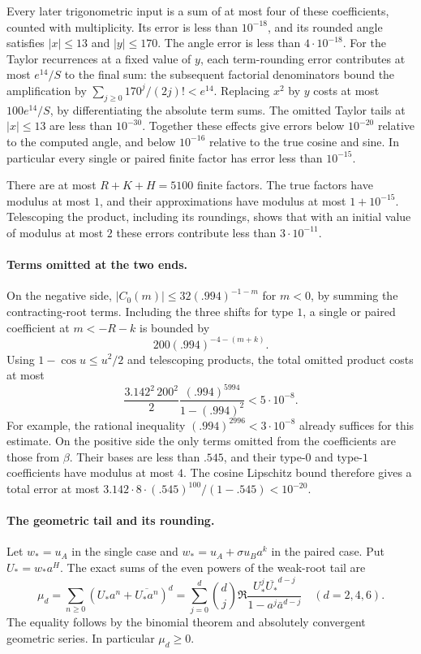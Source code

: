 Every later trigonometric input is a sum of at most four of these
coefficients, counted with multiplicity.  Its error is less than
$10^{-18}$, and its rounded angle satisfies $|x|\le13$ and $|y|\le170$.
The angle error is less than $4\cdot10^{-18}$.  For the Taylor
recurrences at a fixed value of $y$, each term-rounding error
contributes at most $e^{14}/S$ to the final sum: the subsequent
factorial denominators bound the amplification by
$\sum_{j\ge0}170^j/(2j)!<e^{14}$.  Replacing $x^2$ by $y$ costs
at most $100e^{14}/S$, by differentiating the absolute term sums.
The omitted Taylor tails at $|x|\le13$ are less than $10^{-30}$.
Together these effects give errors below $10^{-20}$ relative to
the computed angle, and below $10^{-16}$ relative to the true
cosine and sine.  In particular every single or paired finite
factor has error less than $10^{-15}$.

There are at most $R+K+H=5100$ finite factors.  The true factors have
modulus at most $1$, and their approximations have modulus at most
$1+10^{-15}$.  Telescoping the product, including its roundings,
shows that with an initial value of modulus at most $2$ these errors
contribute less than $3\cdot10^{-11}$.

\paragraph{Terms omitted at the two ends.}
On the negative side, $|C_0(m)|\le32(.994)^{-1-m}$ for $m<0$,
by summing the contracting-root terms.  Including the three shifts
for type $1$, a single or paired coefficient at $m<-R-k$ is bounded by
\[
 200(.994)^{-4-(m+k)}.
\]
Using $1-\cos u\le u^2/2$ and telescoping products, the total omitted
product costs at most
\[
 \frac{3.142^2\,200^2}{2}
 \frac{(.994)^{5994}}{1-(.994)^2}<5\cdot10^{-8}.
\]
For example, the rational inequality $(.994)^{2996}<3\cdot10^{-8}$
already suffices for this estimate.  On the positive side the only
terms omitted from the coefficients are those from $\beta$.
Their bases are less than $.545$, and their type-$0$ and type-$1$
coefficients have modulus at most $4$.  The cosine Lipschitz bound
therefore gives a total error at most
$3.142\cdot8\cdot(.545)^{100}/(1-.545)<10^{-20}$.

\paragraph{The geometric tail and its rounding.}
Let $w_*=u_A$ in the single case and
$w_*=u_A+\sigma u_Ba^k$ in the paired case.  Put $U_*=w_*a^H$.
The exact sums of the even powers of the weak-root tail are
\begin{equation}\label{cert:geometric-moments}
 \mu_d=\sum_{n\ge0}(U_*a^n+\overline{U_*a^n})^d
 =\sum_{j=0}^d\binom dj\Re
 \frac{U_*^j\overline{U_*}^{d-j}}{1-a^j\bar a^{d-j}}
 \quad(d=2,4,6).
\end{equation}
The equality follows by the binomial theorem and absolutely
convergent geometric series.  In particular $\mu_d\ge0$.

